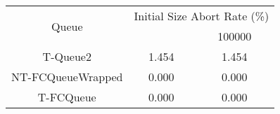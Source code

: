 \begin{tabular}{|c|c|c|}
\hline
\multirow{2}{*}{Queue} & \multicolumn{2}{c|}{Initial Size Abort Rate (\%)}\\\cline{2-3}& \quad 10000 \quad & 100000\\
\hline
\hline
T-Queue2 & 1.454 & 1.454\\
NT-FCQueueWrapped & 0.000 & 0.000\\
T-FCQueue & 0.000 & 0.000\\
\hline\end{tabular}
